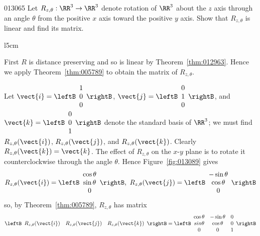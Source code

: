 \begin{example}{}{013065}
Let $R_{z,\theta} : \RR^3 \to \RR^3$ denote rotation of $\RR^3$ about the $z$ axis through an angle $\theta$ from the positive $x$ axis toward the positive $y$ axis. Show that $R_{z,\theta}$ is linear and find its matrix.

\begin{wrapfigure}{l}{5cm} 
\centering

\caption{\label{fig:013089}}
\end{wrapfigure}

\begin{solution} First $R$ is distance preserving and so is linear by Theorem~\ref{thm:012963}. Hence we apply Theorem~\ref{thm:005789} to obtain the matrix of  $R_{z,\theta}$.

Let $\vect{i} = \leftB
\begin{array}{c}
1 \\
0 \\
0
\end{array}
\rightB$, 
$\vect{j} = \leftB
\begin{array}{c}
0 \\
1 \\
0
\end{array}
\rightB$, and 
$\vect{k} = \leftB
\begin{array}{c}
0 \\
0 \\
1
\end{array}
\rightB$ denote the standard basis of $\RR^3$; we must find  $R_{z,\theta}(\vect{i})$, $R_{z,\theta}(\vect{j})$, and  $R_{z,\theta}(\vect{k})$. Clearly  $R_{z,\theta}(\vect{k}) = \vect{k}$. The effect of $R_{z,\theta}$ on the $x$-$y$ plane is to rotate it counterclockwise through the angle $\theta$. Hence Figure~\ref{fig:013089} gives
\begin{equation*}
R_{z,\theta}(\vect{i}) = \leftB
\begin{array}{c}
\cos\theta \\
\sin\theta \\
0
\end{array}
\rightB,\
R_{z,\theta}(\vect{j}) = \leftB
\begin{array}{c}
-\sin\theta \\
\cos\theta \\
0
\end{array}
\rightB
\end{equation*}
so, by Theorem~\ref{thm:005789}, $R_{z,\theta}$ has matrix
\begin{equation*}
\leftB
\begin{array}{ccc}
R_{z,\theta}(\vect{i}) &  R_{z,\theta}(\vect{j}) & R_{z,\theta}(\vect{k})
\end{array}
\rightB = \leftB
\begin{array}{ccc}
\cos\theta & -\sin\theta & 0 \\
sin\theta & \cos\theta & 0\\
0 & 0 & 1
\end{array}
\rightB
\end{equation*}


\end{solution}
\end{example}

